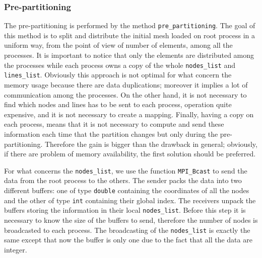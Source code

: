 \subsubsection{Pre-partitioning}
The pre-partitioning is performed by the method \verb|pre_partitioning|. The goal of this method is to split and distribute the initial mesh loaded on root process in a uniform way, from the point of view of number of elements, among all the processes. It is important to notice that only the elements are distributed among the processes while each process owns a copy of the whole \verb|nodes_list| and \verb|lines_list|. Obviously this approach is not optimal for what concern the memory usage because there are data duplications; moreover it implies a lot of communication among the processes. On the other hand, it is not necessary to find which nodes and lines has to be sent to each process, operation quite expensive, and it is not necessary to create a mapping. Finally, having a copy on each process, means that it is not necessary to compute and send these information each time that the partition changes but only during the pre-partitioning. Therefore the gain is bigger than the drawback in general; obviously,
if there are problem of memory availability, the first solution should be preferred.
\medskip

For what concerns the \verb|nodes_list|, we use the function \verb|MPI_Bcast| to send the data from the root process to the others. The sender packs the data into two different buffers: one of type \verb|double| containing the coordinates of all the nodes and the other of type \verb|int| containing their global index. The receivers unpack the buffers storing the information in their local \verb|nodes_list|. Before this step it is necessary to know the size of the buffers to send, therefore the number of nodes is broadcasted to each process. The broadcasting of the \verb|nodes_list| is exactly the same except that now the buffer is only one due to the fact that all the data are integer.
\medskip


